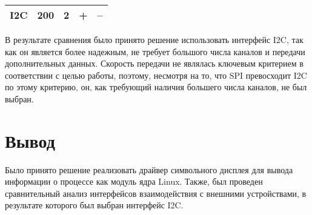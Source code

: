 \begin{table}[h]
\begin{center}
\begin{tabular}{|c|cccc|}
I2C                                                                                                              & \multicolumn{1}{c|}{200}                                                                                & \multicolumn{1}{c|}{2}                                                                 & \multicolumn{1}{c|}{+}                                                             & –                                                                        \\ \hline
\end{tabular}
\end{center}
\end{table}

В результате сравнения было принято решение использовать интерфейс I2C, так как он является более надежным, не требует большого числа каналов и передачи дополнительных данных. Скорость передачи не являлась ключевым критерием в соответствии с целью работы, поэтому, несмотря на то, что SPI превосходит I2C по этому критерию, он, как требующий наличия большего числа каналов, не был выбран.

\section*{Вывод}
Было принято решение реализовать драйвер символьного дисплея для вывода информации о процессе как модуль ядра Linux. Также, был проведен сравнительный анализ интерфейсов взаимодействия с внешними устройствами, в результате которого был выбран интерфейс I2C.

